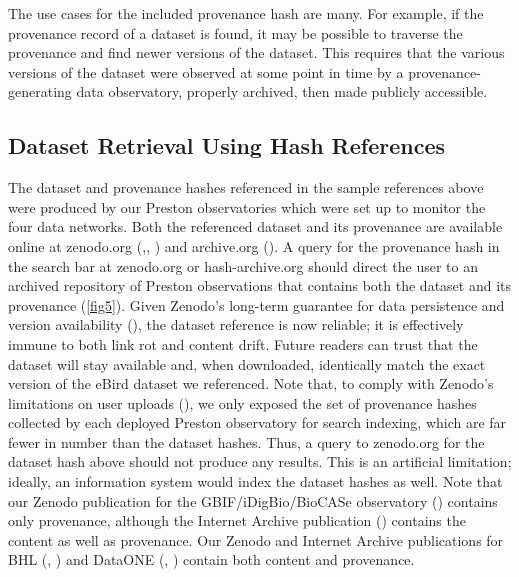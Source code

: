 \documentclass[10pt,letterpaper]{article}
\begin{document}
 The use cases for the included provenance hash are many. For example, if the provenance record of a dataset is found, it may be possible to traverse the provenance and find newer versions of the dataset. This requires that the various versions of the dataset were observed at some point in time by a provenance-generating data observatory, properly archived, then made publicly accessible.

\subsection*{Dataset Retrieval Using Hash References}

The dataset and provenance hashes referenced in the sample references above were produced by our Preston observatories which were set up to monitor the four data networks. Both the referenced dataset and its provenance are available online at zenodo.org (\cite{poelen_jorrit_h_2019_3483218},\cite{poelen_jorrit_h_2019_3484555}, \cite{poelen_jorrit_h_2019_3484205}) and archive.org (\cite{poelen_jorrit_h_2019_archive_org}). A query for the provenance hash in the search bar at zenodo.org or hash-archive.org should direct the user to an archived repository of Preston observations that contains both the dataset and its provenance (\ref{fig5}). Given Zenodo’s long-term guarantee for data persistence and version availability (\cite{zenodo_2019}), the dataset reference is now reliable; it is effectively immune to both link rot and content drift. Future readers can trust that the dataset will stay available and, when downloaded, identically match the exact version of the eBird dataset we referenced. Note that, to comply with Zenodo’s limitations on user uploads (\cite{zenodo_2019}), we only exposed the set of provenance hashes collected by each deployed Preston observatory for search indexing, which are far fewer in number than the dataset hashes. Thus, a query to zenodo.org for the dataset hash above should not produce any results. This is an artificial limitation; ideally, an information system would index the dataset hashes as well. Note that our Zenodo publication for the GBIF/iDigBio/BioCASe observatory (\cite{poelen_jorrit_h_2019_3484205}) contains only provenance, although the Internet Archive publication (\cite{poelen_jorrit_h_2019_archive_org}) contains the content as well as provenance. Our Zenodo and Internet Archive publications for BHL (\cite{poelen_jorrit_h_2019_3484555}, \cite{poelen_jorrit_h_2019_archive_org_bhl}) and DataONE (\cite{poelen_jorrit_h_2019_3483218}, \cite{poelen_jorrit_h_2019_archive_org_dataone}) contain both content and provenance.
\end{document}
